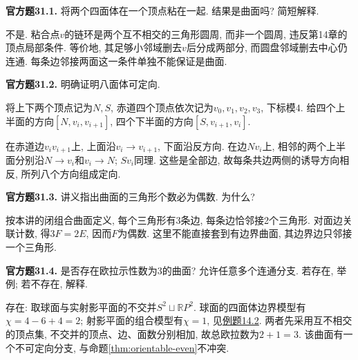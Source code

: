 \begin{exercise}\label{cq:31.1}
\textbf{官方题31.1.} 将两个四面体在一个顶点粘在一起. 结果是曲面吗? 简短解释.
\begin{center}
\end{center}
\end{exercise}
\begin{solution}
不是. 粘合点$v$的链环是两个互不相交的三角形圆周, 而非一个圆周, 违反第14章的顶点局部条件. 等价地, 其足够小邻域删去$v$后分成两部分, 而圆盘邻域删去中心仍连通. 每条边邻接两面这一条件单独不能保证是曲面.
\end{solution}

\begin{exercise}\label{cq:31.2}
\textbf{官方题31.2.} 明确证明八面体可定向.
\end{exercise}
\begin{solution}
将上下两个顶点记为$N,S$, 赤道四个顶点依次记为$v_0,v_1,v_2,v_3$, 下标模$4$. 给四个上半面的方向$[N,v_i,v_{i+1}]$, 四个下半面的方向$[S,v_{i+1},v_i]$.

在赤道边$v_iv_{i+1}$上, 上面沿$v_i\to v_{i+1}$, 下面沿反方向. 在边$Nv_i$上, 相邻的两个上半面分别沿$N\to v_i$和$v_i\to N$; $Sv_i$同理. 这些是全部边, 故每条共边两侧的诱导方向相反, 所列八个方向组成定向.
\end{solution}

\begin{exercise}\label{cq:31.3}
\textbf{官方题31.3.} 讲义指出曲面的三角形个数必为偶数. 为什么?
\end{exercise}
\begin{solution}
按本讲的闭组合曲面定义, 每个三角形有3条边, 每条边恰邻接2个三角形. 对面边关联计数, 得$3F=2E$, 因而$F$为偶数. 这里不能直接套到有边界曲面, 其边界边只邻接一个三角形.
\end{solution}

\begin{exercise}\label{cq:31.4}
\textbf{官方题31.4.} 是否存在欧拉示性数为$3$的曲面? 允许任意多个连通分支. 若存在, 举例; 若不存在, 解释.
\end{exercise}
\begin{solution}
存在: 取球面与实射影平面的不交并$S^2\sqcup\mathbb RP^2$. 球面的四面体边界模型有$\chi=4-6+4=2$; 射影平面的组合模型有$\chi=1$, 见\hyperlink{example.14.2}{例题14.2}. 两者先采用互不相交的顶点集, 不交并的顶点、边、面数分别相加, 故总欧拉数为$2+1=3$. 该曲面有一个不可定向分支, 与命题\ref{thm:orientable-even}不冲突.
\end{solution}

